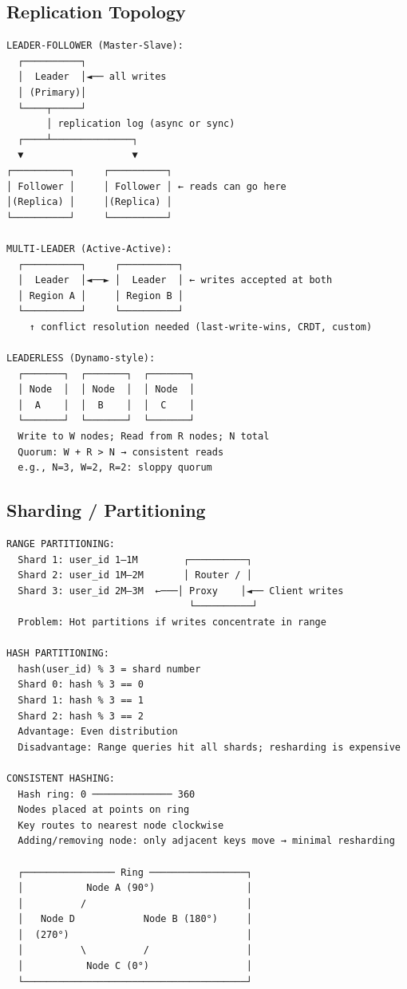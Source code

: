 \documentclass[11pt]{article}
\begin{document}
\subsection{Replication Topology}\label{replication-topology}

\setcodelang{}

\begin{verbatim}
LEADER-FOLLOWER (Master-Slave):
  ┌──────────┐
  │  Leader  │◄── all writes
  │ (Primary)│
  └────┬─────┘
       │ replication log (async or sync)
  ┌────┴──────────────┐
  ▼                   ▼
┌──────────┐     ┌──────────┐
│ Follower │     │ Follower │ ← reads can go here
│(Replica) │     │(Replica) │
└──────────┘     └──────────┘

MULTI-LEADER (Active-Active):
  ┌──────────┐     ┌──────────┐
  │  Leader  │◄──► │  Leader  │ ← writes accepted at both
  │ Region A │     │ Region B │
  └──────────┘     └──────────┘
    ↑ conflict resolution needed (last-write-wins, CRDT, custom)

LEADERLESS (Dynamo-style):
  ┌───────┐  ┌───────┐  ┌───────┐
  │ Node  │  │ Node  │  │ Node  │
  │  A    │  │  B    │  │  C    │
  └───────┘  └───────┘  └───────┘
  Write to W nodes; Read from R nodes; N total
  Quorum: W + R > N → consistent reads
  e.g., N=3, W=2, R=2: sloppy quorum
\end{verbatim}

\subsection{Sharding / Partitioning}\label{sharding--partitioning}

\setcodelang{}

\begin{verbatim}
RANGE PARTITIONING:
  Shard 1: user_id 1–1M        ┌──────────┐
  Shard 2: user_id 1M–2M       │ Router / │
  Shard 3: user_id 2M–3M  ←───│ Proxy    │◄── Client writes
                                └──────────┘
  Problem: Hot partitions if writes concentrate in range

HASH PARTITIONING:
  hash(user_id) % 3 = shard number
  Shard 0: hash % 3 == 0
  Shard 1: hash % 3 == 1
  Shard 2: hash % 3 == 2
  Advantage: Even distribution
  Disadvantage: Range queries hit all shards; resharding is expensive

CONSISTENT HASHING:
  Hash ring: 0 ────────────── 360
  Nodes placed at points on ring
  Key routes to nearest node clockwise
  Adding/removing node: only adjacent keys move → minimal resharding
  
  ┌──────────────── Ring ─────────────────┐
  │           Node A (90°)                │
  │          /                            │
  │   Node D            Node B (180°)     │
  │  (270°)                               │
  │          \          /                 │
  │           Node C (0°)                 │
  └───────────────────────────────────────┘
\end{verbatim}
\end{document}
